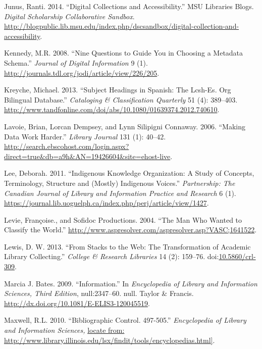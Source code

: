 \documentclass[]{article}
\begin{document}
\hypertarget{ref-junusux5fdigitalux5f2014}{}
Junus, Ranti. 2014. ``Digital Collections and Accessibility.'' MSU
Libraries Blogs. \emph{Digital Scholarship Collaborative Sandbox}.
\url{http://blogpublic.lib.msu.edu/index.php/dscsandbox/digital-collection-and-accessibility}.

\hypertarget{ref-kennedyux5fnineux5f2008}{}
Kennedy, M.R. 2008. ``Nine Questions to Guide You in Choosing a Metadata
Schema.'' \emph{Journal of Digital Information} 9 (1).
\url{http://journals.tdl.org/jodi/article/view/226/205}.

\hypertarget{ref-kreycheux5fsubjectux5f2013}{}
Kreyche, Michael. 2013. ``Subject Headings in Spanish: The Lcsh-Es. Org
Bilingual Database.'' \emph{Cataloging \& Classification Quarterly} 51
(4): 389--403.
\url{http://www.tandfonline.com/doi/abs/10.1080/01639374.2012.740610}.

\hypertarget{ref-lavoieux5fmakingux5f2006}{}
Lavoie, Brian, Lorcan Dempsey, and Lynn Silipigni Connaway. 2006.
``Making Data Work Harder.'' \emph{Library Journal} 131 (1): 40--42.
\url{http://search.ebscohost.com/login.aspx?direct=true\&db=a9h\&AN=19426604\&site=ehost-live}.

\hypertarget{ref-leeux5findigenousux5f2011}{}
Lee, Deborah. 2011. ``Indigenous Knowledge Organization: A Study of
Concepts, Terminology, Structure and (Mostly) Indigenous Voices.''
\emph{Partnership: The Canadian Journal of Library and Information
Practice and Research} 6 (1).
\url{https://journal.lib.uoguelph.ca/index.php/perj/article/view/1427}.

\hypertarget{ref-levieux5fmanux5f2004}{}
Levie, Françoise., and Sofidoc Productions. 2004. ``The Man Who Wanted
to Classify the World.''
\url{http://www.aspresolver.com/aspresolver.asp?VASC;1641522}.

\hypertarget{ref-lewisux5fstacksux5f2013}{}
Lewis, D. W. 2013. ``From Stacks to the Web: The Transformation of
Academic Library Collecting.'' \emph{College \& Research Libraries} 14
(2): 159--76.
doi:\href{https://doi.org/10.5860/crl-309}{10.5860/crl-309}.

\hypertarget{ref-marciaux5fj.ux5fbatesux5finformationux5f2009}{}
Marcia J. Bates. 2009. ``Information.'' In \emph{Encyclopedia of Library
and Information Sciences, Third Edition}, null:2347--60. null. Taylor \&
Francis. \url{http://dx.doi.org/10.1081/E-ELIS3-120045519}.

\hypertarget{ref-maxwellux5fbibliographicux5f2010}{}
Maxwell, R.L. 2010. ``Bibliographic Control. 497-505.''
\emph{Encyclopedia of Library and Information Sciences,}
\href{locate\%20from:\%20http://www.library.illinois.edu/lsx/findit/tools/encyclopedias.html\%5D}{locate from: http://www.library.illinois.edu/lsx/findit/tools/encyclopedias.html{]}}.
\end{document}
